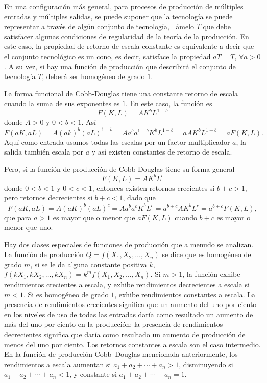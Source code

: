 En una configuración más general, para procesos de producción de múltiples entradas y múltiples salidas, se puede suponer que la tecnología se puede representar a través de algún conjunto de tecnología, llámelo $T$ que debe satisfacer algunas condiciones de regularidad de la teoría de la producción. En este caso, la propiedad de retorno de escala constante es equivalente a decir que el conjunto tecnológico es un cono, es decir, satisface la propiedad $aT=T$, $\forall a>0$. A su vez, si hay una función de producción que describirá el conjunto de tecnología $T$, deberá ser homogéneo de grado $1$.


\begin{definition}
	La forma funcional de Cobb-Douglas tiene una constante retorno de escala cuando la suma de sus exponentes es $1$. En este caso, la función es
	\begin{equation}
	F\left(K,L\right)=AK^{b}L^{1-b}
	\end{equation}
	donde $A>0$ y $0<b<1$. Así \[ F\left(aK,aL\right)=A{\left(ak\right)}^{b}{\left(aL\right)}^{1-b}=Aa^{b}a^{1-b}K^{b}L^{1-b}=aAK^{b}L^{1-b}=aF\left(K,L\right). \] Aquí como entrada usamos todas las escalas por un factor multiplicador $a$, la salida también escala por $a$ y así existen constantes de retorno de escala.
	
	Pero, si la función de producción de Cobb-Douglas tiene su forma general
	\begin{equation}
	F\left(K,L\right)=AK^{b}L^{c}
	\end{equation}
	donde $0<b<1$ y $0<c<1$, entonces existen retornos crecientes si $b+c>1$, pero retornos decrecientes si $b+c<1$, dado que \[ F\left(aK,aL\right)=A{\left(aK\right)}^{b}{\left(aL\right)}^{c}=Aa^{b}a^{c}K^{b}L^{c}=a^{b+c}AK^{b}L^{c}=a^{b+c}F\left(K,L\right), \] que para $a>1$ es mayor que o menor que $aF\left(K,L\right)$ cuando $b+c$ es mayor o menor que uno.
\end{definition}

Hay dos clases especiales de funciones de producción que a menudo se analizan. La función de producción $Q=f\left(X_{1},X_{2},\ldots,X_{n}\right)$ se dice que es homogéneo de grado $m$, si se le da alguna constante positiva $k$, $f\left(kX_{1},kX_{2},\ldots,kX_{n}\right)=k^{m}f\left(X_{1},X_{2},\ldots, X_{n}\right)$. Si $m>1$, la función exhibe rendimientos crecientes a escala, y exhibe rendimientos decrecientes a escala si $m<1$. Si es homogéneo de grado $1$, exhibe rendimientos constantes a escala. La presencia de rendimientos crecientes significa que un aumento del uno por ciento en los niveles de uso de todas las entradas daría como resultado un aumento de más del uno por ciento en la producción; la presencia de rendimientos decrecientes significa que daría como resultado un aumento de producción de menos del uno por ciento. Los retornos constantes a escala son el caso intermedio. En la función de producción Cobb–Douglas mencionada anteriormente, los rendimientos a escala aumentan si $a_{1}+a_{2}+\cdots+a_{n}> 1$, disminuyendo si $a_{1}+a_{2}+\cdots+a_{n}<1$, y constante si $a_{1}+a_{2}+\cdots+a_{n}=1$.

